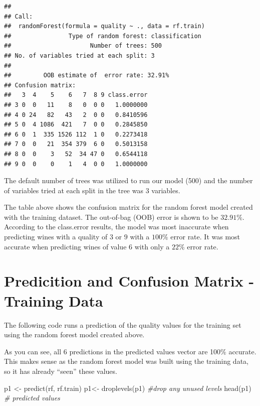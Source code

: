 \documentclass[
]{book}
\newenvironment{Shaded}{\begin{snugshade}}{\end{snugshade}}
\newcommand{\CommentTok}[1]{\textcolor[rgb]{0.56,0.35,0.01}{\textit{#1}}}
\newcommand{\FunctionTok}[1]{\textcolor[rgb]{0.00,0.00,0.00}{#1}}
\newcommand{\NormalTok}[1]{#1}
\newcommand{\OtherTok}[1]{\textcolor[rgb]{0.56,0.35,0.01}{#1}}
\begin{document}
\begin{verbatim}
## 
## Call:
##  randomForest(formula = quality ~ ., data = rf.train) 
##                Type of random forest: classification
##                      Number of trees: 500
## No. of variables tried at each split: 3
## 
##         OOB estimate of  error rate: 32.91%
## Confusion matrix:
##   3  4    5    6   7  8 9 class.error
## 3 0  0   11    8   0  0 0   1.0000000
## 4 0 24   82   43   2  0 0   0.8410596
## 5 0  4 1086  421   7  0 0   0.2845850
## 6 0  1  335 1526 112  1 0   0.2273418
## 7 0  0   21  354 379  6 0   0.5013158
## 8 0  0    3   52  34 47 0   0.6544118
## 9 0  0    0    1   4  0 0   1.0000000
\end{verbatim}

The default number of trees was utilized to run our model (500) and the number of variables tried at each split in the tree was \(3\) variables.

The table above shows the confusion matrix for the random forest model created with the training dataset. The out-of-bag (OOB) error is shown to be \(32.91\%\). According to the class.error results, the model was most inaccurate when predicting wines with a quality of \(3\) or \(9\) with a \(100\%\) error rate. It was most accurate when predicting wines of value 6 with only a \(22\%\) error rate.

\hypertarget{predicition-and-confusion-matrix---training-data}{%
\section{Predicition and Confusion Matrix - Training Data}\label{predicition-and-confusion-matrix---training-data}}

The following code runs a prediction of the quality values for the training set using the random forest model created above.

As you can see, all 6 predictions in the predicted values vector are 100\% accurate. This makes sense as the random forest model was built using the training data, so it has already ``seen'' these values.

\begin{Shaded}
\begin{Highlighting}[]
\NormalTok{p1 }\OtherTok{\textless{}{-}} \FunctionTok{predict}\NormalTok{(rf, rf.train)}
\NormalTok{p1}\OtherTok{\textless{}{-}} \FunctionTok{droplevels}\NormalTok{(p1) }\CommentTok{\#drop any unused levels}
\FunctionTok{head}\NormalTok{(p1) }\CommentTok{\# predicted values}
\end{Highlighting}
\end{Shaded}
\end{document}
